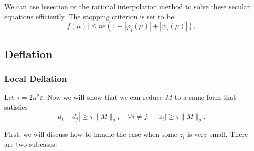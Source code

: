 \documentclass[12pt]{article}
\newcommand{\ep}{\varepsilon}
\begin{document}
We can use bisection or the rational interpolation method to solve these secular equations efficiently. The stopping criterion is set to be
\[
    |f(\mu)| \leq n \ep (1 + |\varphi_i(\mu)| + |\psi_i(\mu)|),
\]

\subsection{Deflation}

\subsubsection{Local Deflation}

Let \(\tau = 2 n^2 \ep\). Now we will show that we can reduce \(M\) to a same form that satisfies
\[
    |d_{i} - d_{j}| \geq \tau \|M\|_2, \quad \forall i \neq j, \quad |z_i| \geq \tau \|M\|_2.
\]

First, we will discuss how to handle the case when some \(z_i\) is very small. There are two subcases:
\end{document}
